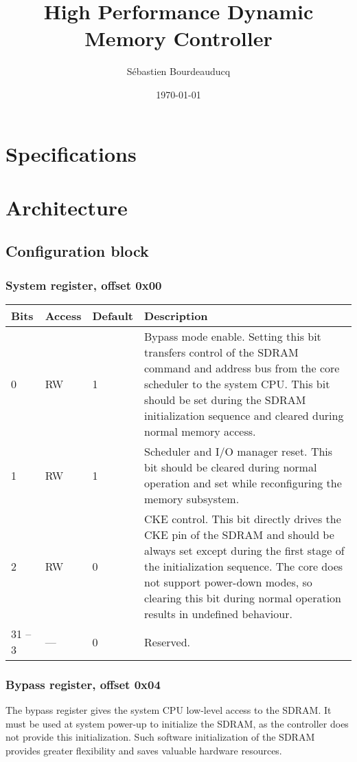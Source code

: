 \documentclass[a4paper,11pt]{article}
\title{High Performance Dynamic Memory Controller}
\author{S\'ebastien Bourdeauducq}
\date{\today}
\begin{document}
\maketitle{}
\section{Specifications}

\section{Architecture}

\subsection{Configuration block}

\subsubsection{System register, offset 0x00}
\begin{tabular}{|p{1.5cm}|l|l|p{10cm}|}
\hline
\bf Bits & \bf Access & \bf Default & \bf Description \\
\hline
0 & RW & 1 & Bypass mode enable. Setting this bit transfers control of the SDRAM command and address bus from the core scheduler to the system CPU. This bit should be set during the SDRAM initialization sequence and cleared during normal memory access. \\
\hline
1 & RW & 1 & Scheduler and I/O manager reset. This bit should be cleared during normal operation and set while reconfiguring the memory subsystem. \\
\hline
2 & RW & 0 & CKE control. This bit directly drives the CKE pin of the SDRAM and should be always set except during the first stage of the initialization sequence. The core does not support power-down modes, so clearing this bit during normal operation results in undefined behaviour. \\
\hline
31 -- 3 & --- & 0 & Reserved. \\
\hline
\end{tabular}

\subsubsection{Bypass register, offset 0x04}
The bypass register gives the system CPU low-level access to the SDRAM. It must be used at system power-up to initialize the SDRAM, as the controller does not provide this initialization. Such software initialization of the SDRAM provides greater flexibility and saves valuable hardware resources.
\end{document}
